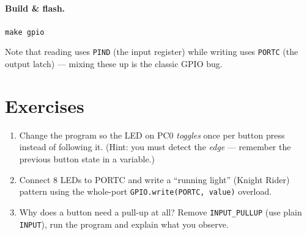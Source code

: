 \documentclass[11pt,a4paper]{article}
\begin{document}
\paragraph{Build \& flash.} \texttt{make gpio}



Note that reading uses \texttt{PIND} (the input register) while writing uses
\texttt{PORTC} (the output latch) --- mixing these up is the classic GPIO bug.

\section{Exercises}

\begin{enumerate}
  \item Change the program so the LED on PC0 \emph{toggles} once per button
        press instead of following it. (Hint: you must detect the
        \emph{edge} --- remember the previous button state in a variable.)
  \item Connect 8 LEDs to PORTC and write a ``running light'' (Knight Rider)
        pattern using the whole-port \texttt{GPIO.write(PORTC, value)} overload.
  \item Why does a button need a pull-up at all? Remove
        \texttt{INPUT\_PULLUP} (use plain \texttt{INPUT}), run the program and
        explain what you observe.
\end{enumerate}
\end{document}
